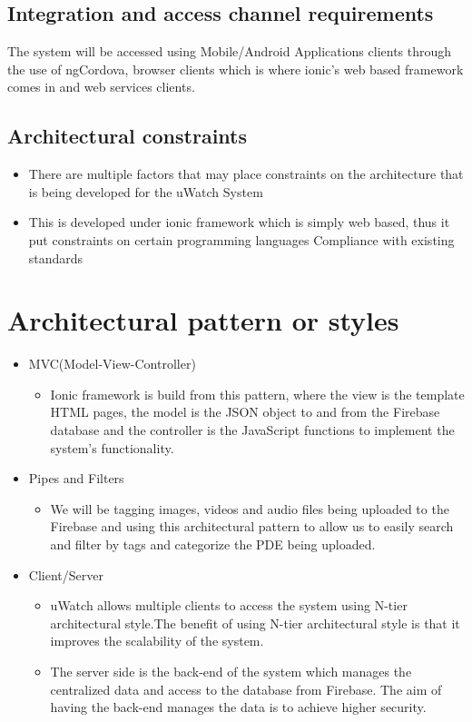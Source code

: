 \documentclass[a4paper,12pt]{article}
\begin{document}
\subsection{Integration and access channel requirements}
The system will be accessed using Mobile/Android Applications clients through the use of ngCordova,  browser clients which is where ionic's web based framework comes in and web services clients.
\subsection{Architectural constraints}
\begin{itemize}
\item There are multiple factors that may place constraints on the architecture that
is being developed for the uWatch System

\item This is developed under ionic framework which is simply web based, thus it put constraints on certain programming languages Compliance with existing standards
\end{itemize}
\section{Architectural pattern or styles}
	\begin{itemize}
		\item MVC(Model-View-Controller)
			\begin{itemize}
				\item Ionic framework is build from this pattern, where the view is the template HTML pages, the model is the JSON object to and from the Firebase database and the controller is the JavaScript functions to implement the system's functionality.
			\end{itemize}
		\item Pipes and Filters
		\begin{itemize}
		\item We will be tagging images, videos and audio files being uploaded to the Firebase and using this architectural pattern to allow us to easily search and filter by tags and categorize the PDE being uploaded.
		\end{itemize}
		\item Client/Server 
			\begin{itemize}
				\item uWatch allows multiple clients to access the system using N-tier
				architectural style.The benefit of using N-tier architectural style is that
				it improves the scalability of the system.
				\item The server side is the back-end of the system which manages the centralized data and access to the database from Firebase. The aim of
having the back-end manages the data is to achieve higher security. 
			\end{itemize}
	\end{itemize}
\end{document}
